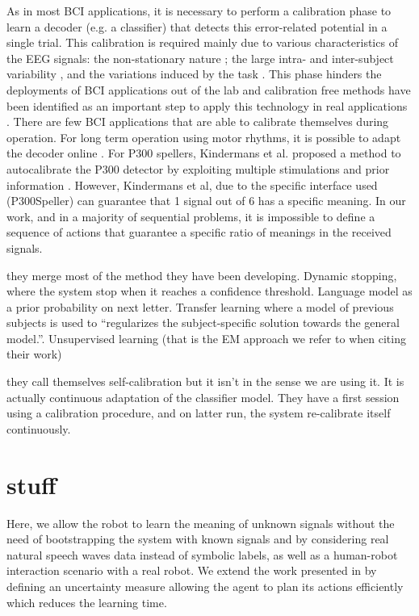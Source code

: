 As in most BCI applications, it is necessary to perform a calibration phase to learn a decoder (e.g. a classifier) that detects this error-related potential in a single trial. This calibration is required mainly due to various characteristics of the EEG signals: the non-stationary nature \cite{vidaurre11}; the large intra- and inter-subject variability \cite{Polich1997}, and the variations induced by the task \cite{iturrate2013task}. This phase hinders the deployments of BCI applications out of the lab and calibration free methods have been identified as an important step to apply this technology in real applications \cite{millan10}. 
There are few BCI applications that are able to calibrate themselves during operation.  For long term operation using motor rhythms, it is possible to adapt the decoder online \cite{vidaurre2010towards}. For P300 spellers, Kindermans et al. proposed a method to autocalibrate the P300 detector by exploiting multiple stimulations and prior information \cite{Kindermans2012a,Kindermans2012b}. However, Kindermans et al, due to the specific interface used (P300Speller) can guarantee that 1 signal out of 6 has a specific meaning. In our work, and in a majority of sequential problems, it is impossible to define a sequence of actions that guarantee a specific ratio of meanings in the received signals.

\cite{kindermans2014integrating} they merge most of the method they have been developing. Dynamic stopping, where the system stop when it reaches a confidence threshold. Language model as a prior probability on next letter. Transfer learning where a model of previous subjects is used to ``regularizes the subject-specific solution towards the general model.''. Unsupervised learning (that is the EM approach we refer to when citing their work)

\cite{schettini2014self} they call themselves self-calibration but it isn't in the sense we are using it. It is actually continuous adaptation of the classifier model. They have a first session using a calibration procedure, and on latter run, the system re-calibrate itself continuously.


\section{stuff}

Here, we allow the robot to learn the meaning of unknown signals without the need of bootstrapping the system with known signals and by considering real natural speech waves data instead of symbolic labels, as well as a human-robot interaction scenario with a real robot. We extend the work presented in \cite{grizou2013robot} by defining an uncertainty measure allowing the agent to plan its actions efficiently which reduces the learning time.
